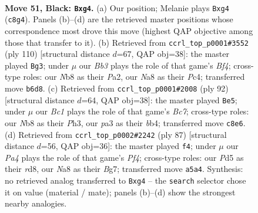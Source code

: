 \documentclass[11pt]{article}
\begin{document}
\clearpage

\begin{figure}[p]\centering
\begin{subfigure}{0.46\textwidth}\centering
\resizebox{\linewidth}{!}{%
\newchessgame
\chessboard[
  setfen={nnb5/1p4k1/1b6/pN1p4/6Pp/PP2P3/3BP1K1/3B4 b - - 0 51},
  showmover=false,
  pgfstyle=straightmove, color=movearrow, markmove={c8-g4}
]}
\caption{}
\end{subfigure}\hfill
\begin{subfigure}{0.46\textwidth}\centering
\resizebox{\linewidth}{!}{%
\newchessgame
\chessboard[
  setfen={8/5pk1/2b1p2p/4P2P/p1P1pBP1/8/Pb1K4/3B4 w - - 0 56},
  showmover=false,
  pgfstyle=straightmove, color=movearrow, markmove={f4-g3}
]}
\caption{}
\end{subfigure}
\\[4pt]
\begin{subfigure}{0.46\textwidth}\centering
\resizebox{\linewidth}{!}{%
\newchessgame
\chessboard[
  setfen={8/2B4p/2B1k1p1/p1n5/Pb2pP2/4P2P/2K5/8 w - - 25 47},
  showmover=false,
  pgfstyle=straightmove, color=movearrow, markmove={c7-e5}
]}
\caption{}
\end{subfigure}\hfill
\begin{subfigure}{0.46\textwidth}\centering
\resizebox{\linewidth}{!}{%
\newchessgame
\chessboard[
  setfen={3R4/1b3kbp/8/n1r1ppP1/1p5N/1P4B1/4BPP1/6K1 b - - 1 44},
  showmover=false,
  pgfstyle=straightmove, color=movearrow, markmove={f5-f4}
]}
\caption{}
\end{subfigure}
\caption{\textbf{Move 51, Black: \texttt{Bxg4}.} (a) Our position; Melanie plays \texttt{Bxg4} (\texttt{c8g4}). Panels (b)--(d) are the retrieved master positions whose correspondence most drove this move (highest QAP objective among those that transfer to it). (b) Retrieved from \texttt{ccrl\_top\_p0001\#3552} (ply 110) [structural distance $d$=67, QAP obj=38]: the master played \texttt{Bg3}; under $\mu$ our \emph{Bb3} plays the role of that game's \emph{Bf4}; cross-type roles: our \emph{N}b8 as their \emph{P}a2, our \emph{N}a8 as their \emph{P}c4; transferred move \texttt{b6d8}. (c) Retrieved from \texttt{ccrl\_top\_p0001\#2008} (ply 92) [structural distance $d$=64, QAP obj=38]: the master played \texttt{Be5}; under $\mu$ our \emph{Bc1} plays the role of that game's \emph{Bc7}; cross-type roles: our \emph{N}b8 as their \emph{P}h3, our \emph{p}a3 as their \emph{b}b4; transferred move \texttt{c8e6}. (d) Retrieved from \texttt{ccrl\_top\_p0002\#2242} (ply 87) [structural distance $d$=56, QAP obj=36]: the master played \texttt{f4}; under $\mu$ our \emph{Pa4} plays the role of that game's \emph{Pf4}; cross-type roles: our \emph{P}d5 as their \emph{r}d8, our \emph{N}a8 as their \emph{B}g7; transferred move \texttt{a5a4}. Synthesis: no retrieved analog transferred to \texttt{Bxg4} -- the \texttt{search} selector chose it on value (material / mate); panels (b)--(d) show the strongest nearby analogies.}
\label{fig:thought-m101}
\end{figure}
\end{document}
